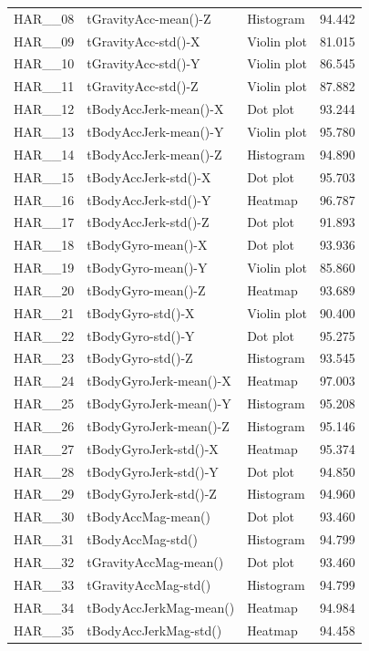 \begin{longtable}{p{2.7cm}p{5.5cm}p{3.4cm}r}
HAR\_\_08 & tGravityAcc-mean()-Z & Histogram & 94.442\\
HAR\_\_09 & tGravityAcc-std()-X & Violin plot & 81.015\\
HAR\_\_10 & tGravityAcc-std()-Y & Violin plot & 86.545\\
HAR\_\_11 & tGravityAcc-std()-Z & Violin plot & 87.882\\
HAR\_\_12 & tBodyAccJerk-mean()-X & Dot plot & 93.244\\
HAR\_\_13 & tBodyAccJerk-mean()-Y & Violin plot & 95.780\\
HAR\_\_14 & tBodyAccJerk-mean()-Z & Histogram & 94.890\\
HAR\_\_15 & tBodyAccJerk-std()-X & Dot plot & 95.703\\
HAR\_\_16 & tBodyAccJerk-std()-Y & Heatmap & 96.787\\
HAR\_\_17 & tBodyAccJerk-std()-Z & Dot plot & 91.893\\
HAR\_\_18 & tBodyGyro-mean()-X & Dot plot & 93.936\\
HAR\_\_19 & tBodyGyro-mean()-Y & Violin plot & 85.860\\
HAR\_\_20 & tBodyGyro-mean()-Z & Heatmap & 93.689\\
HAR\_\_21 & tBodyGyro-std()-X & Violin plot & 90.400\\
HAR\_\_22 & tBodyGyro-std()-Y & Dot plot & 95.275\\
HAR\_\_23 & tBodyGyro-std()-Z & Histogram & 93.545\\
HAR\_\_24 & tBodyGyroJerk-mean()-X & Heatmap & 97.003\\
HAR\_\_25 & tBodyGyroJerk-mean()-Y & Histogram & 95.208\\
HAR\_\_26 & tBodyGyroJerk-mean()-Z & Histogram & 95.146\\
HAR\_\_27 & tBodyGyroJerk-std()-X & Heatmap & 95.374\\
HAR\_\_28 & tBodyGyroJerk-std()-Y & Dot plot & 94.850\\
HAR\_\_29 & tBodyGyroJerk-std()-Z & Histogram & 94.960\\
HAR\_\_30 & tBodyAccMag-mean() & Dot plot & 93.460\\
HAR\_\_31 & tBodyAccMag-std() & Histogram & 94.799\\
HAR\_\_32 & tGravityAccMag-mean() & Dot plot & 93.460\\
HAR\_\_33 & tGravityAccMag-std() & Histogram & 94.799\\
HAR\_\_34 & tBodyAccJerkMag-mean() & Heatmap & 94.984\\
HAR\_\_35 & tBodyAccJerkMag-std() & Heatmap & 94.458\\

\end{longtable}
